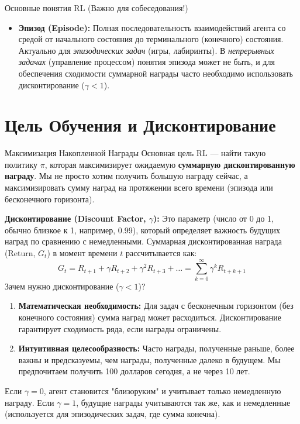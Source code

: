 \begin{textbox}{Основные понятия RL (Важно для собеседования!)}
\begin{itemize}
        \item \textbf{Эпизод (Episode):} Полная последовательность взаимодействий агента со средой от начального состояния до терминального (конечного) состояния. Актуально для \textit{эпизодических задач} (игры, лабиринты). В \textit{непрерывных задачах} (управление процессом) понятия эпизода может не быть, и для обеспечения сходимости суммарной награды часто необходимо использовать дисконтирование ($\gamma < 1$).
    \end{itemize}
\end{textbox}

\section{Цель Обучения и Дисконтирование}

\begin{myblock}{Максимизация Накопленной Награды}
    Основная цель RL — найти такую политику $\pi$, которая максимизирует ожидаемую \textbf{суммарную дисконтированную награду}. Мы не просто хотим получить большую награду сейчас, а максимизировать сумму наград на протяжении всего времени (эпизода или бесконечного горизонта).

    \textbf{Дисконтирование (Discount Factor, $\gamma$):}
    Это параметр (число от 0 до 1, обычно близкое к 1, например, 0.99), который определяет важность будущих наград по сравнению с немедленными. Суммарная дисконтированная награда (Return, $G_t$) в момент времени $t$ рассчитывается как:
    \[ G_t = R_{t+1} + \gamma R_{t+2} + \gamma^2 R_{t+3} + \dots = \sum_{k=0}^{\infty} \gamma^k R_{t+k+1} \]
    Зачем нужно дисконтирование ($\gamma < 1$)?
    \begin{enumerate}
        \item \textbf{Математическая необходимость:} Для задач с бесконечным горизонтом (без конечного состояния) сумма наград может расходиться. Дисконтирование гарантирует сходимость ряда, если награды ограничены.
        \item \textbf{Интуитивная целесообразность:} Часто награды, полученные раньше, более важны и предсказуемы, чем награды, полученные далеко в будущем. Мы предпочитаем получить 100 долларов сегодня, а не через 10 лет.
    \end{enumerate}
    Если $\gamma = 0$, агент становится "близоруким" и учитывает только немедленную награду. Если $\gamma = 1$, будущие награды учитываются так же, как и немедленные (используется для эпизодических задач, где сумма конечна).
\end{myblock}

